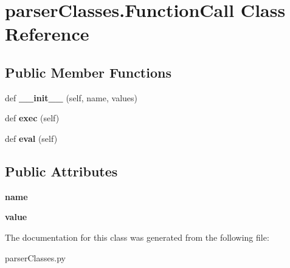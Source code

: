 \hypertarget{classparser_classes_1_1_function_call}{}\section{parser\+Classes.\+Function\+Call Class Reference}
\label{classparser_classes_1_1_function_call}
\subsection*{Public Member Functions}
\begin{DoxyCompactItemize}
\item 
\mbox{\label{classparser_classes_1_1_function_call_ad930b950c34a88b26cef52f5618156d4}} 
def {\bfseries \+\_\+\+\_\+init\+\_\+\+\_\+} (self, name, values)
\item 
\mbox{\label{classparser_classes_1_1_function_call_aea0238c65245e0bcf62a6e23ce872c8a}} 
def {\bfseries exec} (self)
\item 
\mbox{\label{classparser_classes_1_1_function_call_af81e89a97941ea33f06b0790ce7a14ef}} 
def {\bfseries eval} (self)
\end{DoxyCompactItemize}
\subsection*{Public Attributes}
\begin{DoxyCompactItemize}
\item 
\mbox{\label{classparser_classes_1_1_function_call_ae6849adc02987ed0a6309f1adc62b07c}} 
{\bfseries name}
\item 
\mbox{\label{classparser_classes_1_1_function_call_a76fb558f6ce115596d568c321ae4b28d}} 
{\bfseries value}
\end{DoxyCompactItemize}


The documentation for this class was generated from the following file\+:\begin{DoxyCompactItemize}
\item 
parser\+Classes.\+py\end{DoxyCompactItemize}
